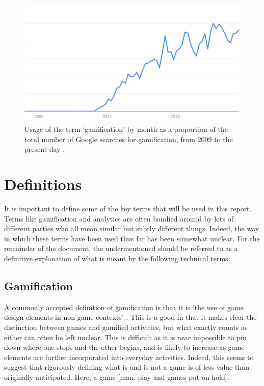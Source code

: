 \documentclass{article}
\begin{document}
\begin{figure}
	\includegraphics{../img/usage-graph.png}
	\caption{Usage of the term `gamification' by month as a proportion of the total number of Google searches for gamification, from 2009 to the present day \cite{usage}.}
	\label{usagegraph}
\end{figure}

\section{Definitions}
It is important to define some of the key terms that will be used in this report. Terms like gamification and analytics are often bandied around by lots of different parties who all mean similar but subtly different things. Indeed, the way in which these terms have been used thus far has been somewhat unclear. For the remainder of the document, the undermentioned should be referred to as a definitive explanation of what is meant by the following technical terms:

\subsection{Gamification}
A commonly accepted definition of gamification is that it is `the use of game design elements in non-game contexts' \cite{deterding2011game}. This is a good in that it makes clear the distinction between games and gamified activities, but what exactly counts as either can often be left unclear. This is difficult as it is near impossible to pin down where one stops and the other begins, and is likely to increase as game elements are further incorporated into everyday activities. Indeed, this seems to suggest that rigorously defining what is and is not a game is of less value than originally anticipated. Here, a game [man, play and games put on hold].
\end{document}
